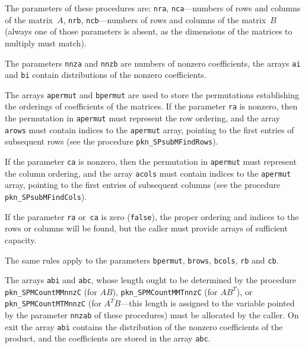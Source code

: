 The parameters of these procedures are: \texttt{nra}, \texttt{nca}---numbers
of rows and columns of the matrix~$A$, \texttt{nrb}, \texttt{ncb}---numbers
of rows and columns of the matrix~$B$ (always one of those parameters is
absent, as the dimensions of the matrices to multiply must match).

The parameters \texttt{nnza} and \texttt{nnzb} are numbers of nonzero
coefficients, the arrays \texttt{ai} and \texttt{bi} contain distributions of
the nonzero coefficients.

The arrays \texttt{apermut} and \texttt{bpermut} are used to store the
permutations establishing the orderings of coefficients of the matrices.
If the parameter \texttt{ra} is nonzero, then the permutation in
\texttt{apermut} must represent the row ordering, and the array
\texttt{arows} must contain indices to the \texttt{apermut} array, pointing
to the first entries of subsequent rows (see the procedure
\texttt{pkn\_SPsubMFindRows}).

If the parameter \texttt{ca} is nonzero, then the permutation in
\texttt{apermut} must represent the column ordering, and the array
\texttt{acols} must contain indices to the \texttt{apermut} array, pointing
to the first entries of subsequent columns (see the procedure
\texttt{pkn\_SPsubMFindCols}).

If the parameter \texttt{ra} or~\texttt{ca} is zero (\texttt{false}), the
proper ordering and indices to the rows or columns will be found, but the
caller must provide arrays of sufficient capacity.

The same rules apply to the parameters \texttt{bpermut}, \texttt{brows},
\texttt{bcols}, \texttt{rb} and \texttt{cb}.

The arrays \texttt{abi} and \texttt{abc}, whose length ought to be determined
by the procedure \texttt{pkn\_SPMCountMMnnzC} (for $AB$),
\texttt{pkn\_SPMCountMMTnnzC} (for $AB^T$), or \\
\texttt{pkn\_SPMCountMTMnnzC}
(for $A^TB$---this length is assigned to the variable pointed by the
parameter \texttt{nnzab} of these procedures) must be allocated by the caller.
On exit the array \texttt{abi} contains the distribution of the nonzero
coefficients of the product, and the coefficients are stored in the array
\texttt{abc}.


